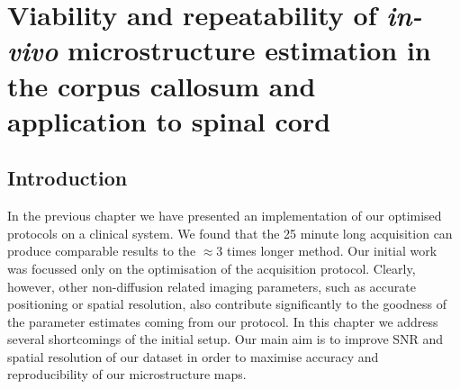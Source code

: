 
%

\newsavebox{\poorBox}
\savebox{\poorBox}{\textcolor{red}{\rule{0.05in}{0.05in}}}
\newsavebox{\fairBox}
\savebox{\fairBox}{\textcolor{orange}{\rule{0.05in}{0.05in}}}
\newsavebox{\moderateBox}
\savebox{\moderateBox}{\textcolor{yellow}{\rule{0.05in}{0.05in}}}
\newsavebox{\substantialBox}
\savebox{\substantialBox}{\textcolor{lime}{\rule{0.05in}{0.05in}}}
\newsavebox{\perfectBox}
\savebox{\perfectBox}{\textcolor{green}{\rule{0.05in}{0.05in}}}


\chapter{Viability and repeatability of \emph{in-vivo} microstructure estimation in the corpus callosum and application to spinal cord}
\label{chapter9}
\section{Introduction}
In the previous chapter we have presented an implementation of our {\SFasym} optimised protocols on a clinical system. We found that the 25 minute long \SFasym{} acquisition can produce comparable results to the $\approx$3 times longer \OI{} method. Our initial work was focussed only on the optimisation of the acquisition protocol. Clearly, however, other non-diffusion related imaging parameters, such as accurate positioning or spatial resolution, also contribute significantly to the goodness of the parameter estimates coming from our protocol. In this chapter we address several shortcomings of the initial \SFasym{} setup. Our main aim is to improve \gls{SNR} and spatial resolution of our dataset in order to maximise accuracy and reproducibility of our microstructure maps. 


